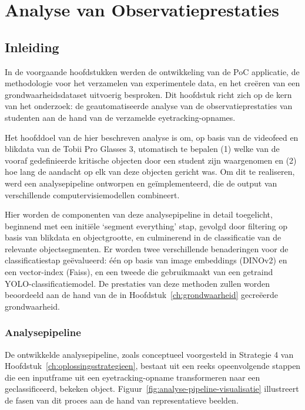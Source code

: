\chapter{Analyse van Observatieprestaties}
\label{ch:analyse}

\section{Inleiding}

In de voorgaande hoofdstukken werden de ontwikkeling van de PoC applicatie, de methodologie voor het verzamelen 
van experimentele data, en het creëren van een grondwaarheidsdataset uitvoerig besproken. 
Dit hoofdstuk richt zich op de kern van het onderzoek: de geautomatiseerde analyse van de 
observatieprestaties van studenten aan de hand van de verzamelde eyetracking-opnames.

Het hoofddoel van de hier beschreven analyse is om, op basis van de videofeed en blikdata van de Tobii Pro Glasses 3, 
utomatisch te bepalen (1) welke van de vooraf gedefinieerde kritische objecten door een student zijn waargenomen en (2) 
hoe lang de aandacht op elk van deze objecten gericht was. 
Om dit te realiseren, werd een analysepipeline ontworpen en geïmplementeerd, die de output van verschillende computervisiemodellen combineert.

Hier worden de componenten van deze analysepipeline in detail toegelicht, beginnend met een initiële `segment everything' stap, 
gevolgd door filtering op basis van blikdata en objectgrootte, en culminerend in de classificatie van de relevante objectsegmenten. 
Er worden twee verschillende benaderingen voor de classificatiestap geëvalueerd: één op basis van image embeddings (DINOv2) en een vector-index (Faiss), 
en een tweede die gebruikmaakt van een getraind YOLO-classificatiemodel. 
De prestaties van deze methoden zullen worden beoordeeld aan de hand van de in Hoofdstuk~\ref{ch:grondwaarheid} gecreëerde grondwaarheid.

\subsection{Analysepipeline}

De ontwikkelde analysepipeline, zoals conceptueel voorgesteld in Strategie 4 van Hoofdstuk~\ref{ch:oplossingsstrategieen}, 
bestaat uit een reeks opeenvolgende stappen die een inputframe uit een eyetracking-opname transformeren naar een geclassificeerd, bekeken object. 
Figuur~\ref{fig:analyse-pipeline-visualisatie} illustreert de fasen van dit proces aan de hand van representatieve beelden.

